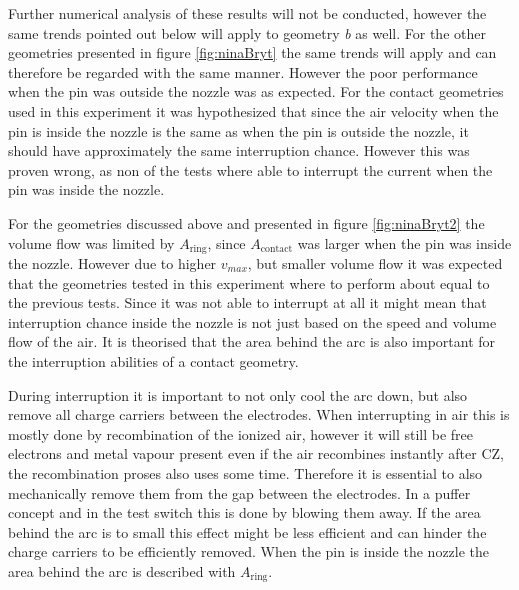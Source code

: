 \documentclass[10pt,a4paper]{article}
\begin{document}
Further numerical analysis of these results will not be conducted, however the same trends pointed out below will apply to geometry \textit{b} as well. For the other geometries presented in figure \ref{fig:ninaBryt} the same trends will apply and can therefore be regarded with the same manner. However the poor performance when the pin was outside the nozzle was as expected. For the contact geometries used in this experiment it was hypothesized that since the air velocity when the pin is inside the nozzle is the same as when the pin is outside the nozzle, it should have approximately the same interruption chance. However this was proven wrong, as non of the tests where able to interrupt the current when the pin was inside the nozzle.

For the geometries discussed above and presented in figure \ref{fig:ninaBryt2} the volume flow was limited by $A_\mathrm{{ring}}$, since $A_\mathrm{{contact}}$ was larger when the pin was inside the nozzle. However due to higher $v_{max}$, but smaller volume flow it was expected that the geometries tested in this experiment where to perform about equal to the previous tests. Since it was not able to interrupt at all it might mean that interruption chance inside the nozzle is not just based on the speed and volume flow of the air. It is theorised that the area behind the arc is also important for the interruption abilities of a contact geometry.

During interruption it is important to not only cool the arc down, but also remove all charge carriers between the electrodes. When interrupting in air this is mostly done by recombination of the ionized air, however it will still be free electrons and metal vapour present even if the air recombines instantly after CZ, the recombination proses also uses some time. Therefore it is essential to also mechanically remove them from the gap between the electrodes. In a puffer concept and in the test switch this is done by blowing them away. If the area behind the arc is to small this effect might be less efficient and can hinder the charge carriers to be efficiently removed. When the pin is inside the nozzle the area behind the arc is described with $A_\mathrm{{ring}}$.
\end{document}
